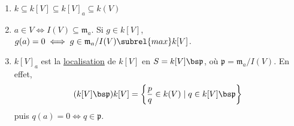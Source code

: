             \begin{remq}
                \begin{enumerate}
                    \item $k \subseteq k[V] \subseteq k[V]_a \subseteq k(V)$
                    \item $a \in V \iff I(V) \subseteq \mathfrak{m}_a$. Si $g \in k[V]$, $g(a) = 0 \iff g \in \mathfrak{m}_a/I(V) \subrel{max} k[V]$.
                    \item $k[V]_a$ est la \hyperref[localisation]{localisation} de $k[V]$ en $S = k[V] \bs \mathfrak{p}$, où $\mathfrak{p} = \mathfrak{m}_a/I(V)$. En effet, 
                    \begin{align*}
                        (k[V] \bs \mathfrak{p})k[V] = \left\{ \frac pq \in k(V) \mid q \in k[V] \bs \mathfrak{p} \right\}
                    \end{align*}
                    puis $q(a) = 0 \iff q \in \mathfrak{p}$.
                \end{enumerate}
            \end{remq}

